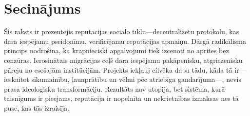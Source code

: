 \documentclass[11pt,a4paper,twocolumn]{article}
\begin{document}
\section{Secinājums}

Šis raksts ir prezentējis reputācijas sociālo tīklu---decentralizētu protokolu, kas dara iespējamu pseidonīmu, verificējamu reputācijas apmaiņu. Dārgā radikālisma princips nodrošina, ka krāpnieciski apgalvojumi tiek izcenoti no aprites bez cenzūras. Ierosinātais migrācijas ceļš dara iespējamu pakāpenisku, atgriezenisku pāreju no esošajām institūcijām. Projekts iekļauj cilvēka dabu tādu, kāda tā ir---ieskaitot sīkumainību, ļaunprātību un vēlmi pēc atriebīga gandarījuma---, nevis prasa ideoloģisku transformāciju. Rezultāts nav utopija, bet sistēma, kurā taisnīgums ir pieejams, reputācija ir nopelnīta un nekrietnības izmaksas nes tā puse, kas tās izraisīja.


\end{document}
